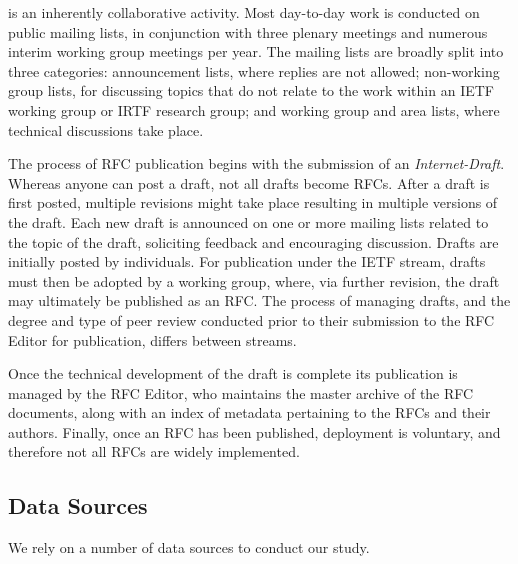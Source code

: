 \documentclass[twocolumn,10pt]{article}
\newcommand{\pb}[1]{\vspace{0.75ex}\noindent{\textbf{#1}}}
\begin{document}
\pb{The standards development process} is an inherently collaborative
activity.  Most day-to-day work is conducted on public mailing lists, in
conjunction with three plenary meetings and numerous interim working group
meetings per year. 
The mailing lists are broadly split into three categories: announcement
lists, where replies are not allowed; non-working group lists, for
discussing topics that do not relate to the work within an IETF working
group or IRTF research group; and working group and area lists, where
technical discussions take place.

The process of RFC publication begins with the submission of an
\emph{Internet-Draft}. Whereas anyone can post a draft, not all drafts
become RFCs. After a draft is first posted, multiple revisions might take
place resulting in multiple versions of the draft. Each new draft is
announced on one or more mailing lists related to the topic of the draft,
soliciting feedback and encouraging discussion. Drafts are initially posted
by individuals. For publication under the IETF stream, drafts must then be
adopted by a working group, where, via further revision, the draft may
ultimately be published as an RFC. The process of managing drafts, and the
degree and type of peer review conducted prior to their submission to the
RFC Editor for publication, differs between streams.

Once the technical development of the draft is complete its publication is
managed by the RFC Editor, who maintains the master archive of the RFC
documents, along with an index of metadata pertaining to the RFCs and their
authors. Finally, once an RFC has been published, deployment is voluntary,
and therefore not all RFCs are widely implemented.

\subsection{Data Sources}
\label{sec:background:data}


We rely on a number of data sources to conduct our study.
\end{document}

